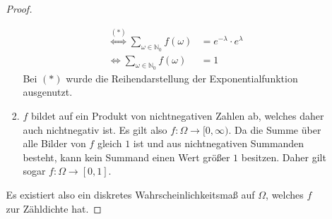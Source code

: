 \documentclass[a4paper]{scrartcl}
\newcommand{\gdw}{\Leftrightarrow}
\begin{document}
\begin{enumerate}[label=\bfseries\arabic*.]
\begin{enumerate}[label=(\alph*)]
\begin{proof}
\begin{enumerate}
\begin{equation*}
\begin{split}
                                    \stackrel{(\ast)}{\gdw}
                                    \sum_{\omega \in \mathbb{N}_0} f(\omega)
                                    &= e^{-\lambda} \cdot e^\lambda \\
                                    \gdw
                                    \sum_{\omega \in \mathbb{N}_0} f(\omega)
                                    &= 1
                                \end{split}
                            \end{equation*}
                            Bei $(\ast)$ wurde die Reihendarstellung der
                            Exponentialfunktion ausgenutzt.

                        \item
                            $f$ bildet auf ein Produkt von nichtnegativen Zahlen
                            ab, welches daher auch nichtnegativ ist.
                            Es gilt also $f\colon \Omega \to [0, \infty)$.
                            Da die Summe über alle Bilder von $f$ gleich $1$
                            ist und aus nichtnegativen Summanden besteht, kann
                            kein Summand einen Wert größer $1$ besitzen.
                            Daher gilt sogar $f\colon \Omega \to [0,1]$.

                    \end{enumerate}
                    Es existiert also ein diskretes Wahrscheinlichkeitsmaß auf
                    $\Omega$, welches $f$ zur Zähldichte hat.
                \end{proof}


\end{enumerate}
\end{enumerate}
\end{document}
